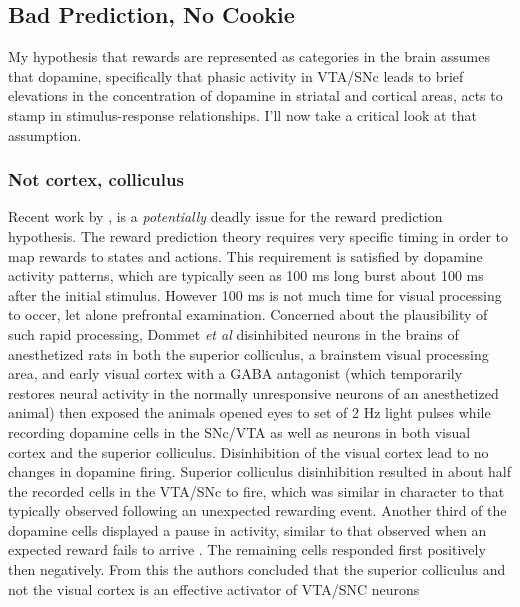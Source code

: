 \documentclass[doc,12pt]{apa}        %
\begin{document}
\subsection{Bad Prediction, No Cookie}
\label{sub:bad}
My hypothesis that rewards are represented as categories in the brain assumes that dopamine, specifically that phasic activity in VTA/SNc leads to brief elevations in the concentration of dopamine in striatal and cortical areas, acts to stamp in stimulus-response relationships.  I'll now take a critical look at that assumption.

\subsubsection{Not cortex, colliculus}
\label{subsub:colliculus}
Recent work by , is a \emph{potentially} deadly issue for the reward prediction hypothesis.  The reward prediction theory requires very specific timing in order to map rewards to states and actions.  This requirement is satisfied by dopamine activity patterns, which are typically seen as 100 ms long burst about 100 ms after the initial stimulus.  However 100 ms is not much time for visual processing to occer, let alone prefrontal examination.  Concerned about the plausibility of such rapid processing, Dommet \emph{et al} disinhibited neurons in the brains of anesthetized rats in both the superior colliculus, a brainstem visual processing area, and early visual cortex with a GABA antagonist (which temporarily restores neural activity in the normally unresponsive neurons of an anesthetized animal) then exposed the animals opened eyes to set of 2 Hz light pulses while recording dopamine cells in the SNc/VTA as well as neurons in both visual cortex and the superior colliculus.  Disinhibition of the visual cortex lead to no changes in dopamine firing.  Superior colliculus disinhibition resulted in about half the recorded cells in the VTA/SNc to fire, which was similar in character to that typically observed following an unexpected rewarding event.  Another third of the dopamine cells displayed a pause in activity, similar to that observed when an expected reward fails to arrive \cite{Mirenowicz:1994p7185}.  The remaining cells responded first positively then negatively.  From this the authors concluded that the superior colliculus and not the visual cortex is an effective activator of VTA/SNC neurons
\end{document}
